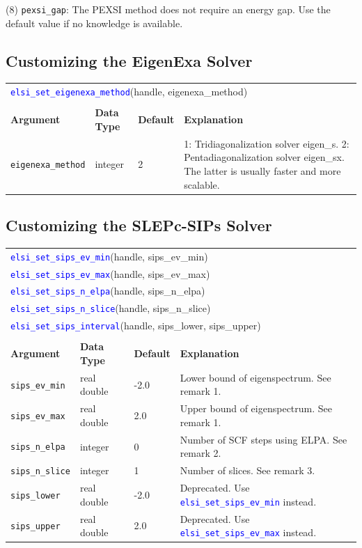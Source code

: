 \documentclass{report}
\newcommand{\api}[1]{\textcolor{blue}{\texttt{#1}}}
\begin{document}
(8) \texttt{pexsi\_gap}: The PEXSI method does not require an energy gap. Use the default value if no knowledge is available.

\subsection{Customizing the EigenExa Solver}
\label{subsec:setter_eigenexa}
\begin{tabular}[]{|p{30mm}|p{20mm}|p{15mm}|p{97mm}|}
\multicolumn{4}{l}{\api{elsi\_set\_eigenexa\_method}(handle, eigenexa\_method)}\\
\multicolumn{4}{l}{}\\
\hline
\multicolumn{1}{|l|}{\textbf{Argument}} & \multicolumn{1}{l|}{\textbf{Data Type}} & \multicolumn{1}{l|}{\textbf{Default}} & \multicolumn{1}{l|}{\textbf{Explanation}}\\
\hline
\texttt{eigenexa\_method} & integer & 2 & 1: Tridiagonalization solver eigen\_s. 2: Pentadiagonalization solver eigen\_sx. The latter is usually faster and more scalable.\\
\hline
\end{tabular}

\subsection{Customizing the SLEPc-SIPs Solver}
\label{subsec:setter_sips}
\begin{tabular}[]{|p{30mm}|p{20mm}|p{15mm}|p{97mm}|}
\multicolumn{4}{l}{\api{elsi\_set\_sips\_ev\_min}(handle, sips\_ev\_min)}\\
\multicolumn{4}{l}{\api{elsi\_set\_sips\_ev\_max}(handle, sips\_ev\_max)}\\
\multicolumn{4}{l}{\api{elsi\_set\_sips\_n\_elpa}(handle, sips\_n\_elpa)}\\
\multicolumn{4}{l}{\api{elsi\_set\_sips\_n\_slice}(handle, sips\_n\_slice)}\\
\multicolumn{4}{l}{\api{elsi\_set\_sips\_interval}(handle, sips\_lower, sips\_upper)}\\
\multicolumn{4}{l}{}\\
\hline
\multicolumn{1}{|l|}{\textbf{Argument}} & \multicolumn{1}{l|}{\textbf{Data Type}} & \multicolumn{1}{l|}{\textbf{Default}} & \multicolumn{1}{l|}{\textbf{Explanation}}\\
\hline
\texttt{sips\_ev\_min}  & real double & -2.0 & Lower bound of eigenspectrum. See remark 1.\\
\hline
\texttt{sips\_ev\_max}  & real double & 2.0  & Upper bound of eigenspectrum. See remark 1.\\
\hline
\texttt{sips\_n\_elpa}  & integer     & 0    & Number of SCF steps using ELPA. See remark 2.\\
\hline
\texttt{sips\_n\_slice} & integer     & 1    & Number of slices. See remark 3.\\
\hline
\texttt{sips\_lower}    & real double & -2.0 & Deprecated. Use \api{elsi\_set\_sips\_ev\_min} instead.\\
\hline
\texttt{sips\_upper}    & real double & 2.0  & Deprecated. Use \api{elsi\_set\_sips\_ev\_max} instead.\\
\hline
\end{tabular}
\end{document}
